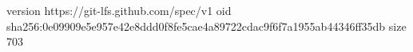 version https://git-lfs.github.com/spec/v1
oid sha256:0e09909e5e957e42e8ddd0f8fe5cae4a89722cdac9f6f7a1955ab44346ff35db
size 703
